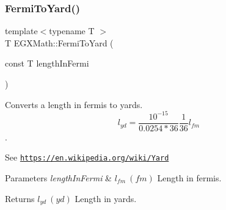 \subsubsection{\texorpdfstring{Fermi\+To\+Yard()}{FermiToYard()}}
{\footnotesize\ttfamily template$<$typename T $>$ \\
T E\+G\+X\+Math\+::\+Fermi\+To\+Yard (\begin{DoxyParamCaption}\item[{const T}]{length\+In\+Fermi }\end{DoxyParamCaption})}



Converts a length in fermis to yards. \[ l_{yd}= \frac{10^{-15}}{0.0254 * 36} \frac{1}{36} l_{fm} \]. 

See \href{https://en.wikipedia.org/wiki/Yard}{\tt https\+://en.\+wikipedia.\+org/wiki/\+Yard} 
\begin{DoxyParams}{Parameters}
{\em length\+In\+Fermi} & $ l_{fm}\ (fm)$ Length in fermis. \\
\hline
\end{DoxyParams}
\begin{DoxyReturn}{Returns}
$ l_{yd}\ (yd)$ Length in yards. 
\end{DoxyReturn}
